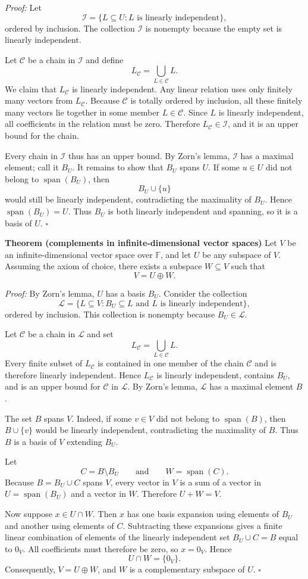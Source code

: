 \documentclass[a4paper,11pt,abstract=true]{scrartcl}
\theoremstyle{dotlessP}
\theoremstyle{dotlessS}
\theoremstyle{remark}
\theoremstyle{definition}
\begin{document}
\textit{Proof:} Let
\[
\mathcal{I}=\{L\subseteq U:L\text{ is linearly independent}\},
\]
ordered by inclusion. The collection $\mathcal{I}$ is nonempty because the
empty set is linearly independent.

Let $\mathcal{C}$ be a chain in $\mathcal{I}$ and define
\[
L_{\mathcal{C}}=\bigcup_{L\in\mathcal{C}}L.
\]
We claim that $L_{\mathcal{C}}$ is linearly independent. Any linear relation
uses only finitely many vectors from $L_{\mathcal{C}}$. Because
$\mathcal{C}$ is totally ordered by inclusion, all these finitely many
vectors lie together in some member $L\in\mathcal{C}$. Since $L$ is linearly
independent, all coefficients in the relation must be zero. Therefore
$L_{\mathcal{C}}\in\mathcal{I}$, and it is an upper bound for the chain.

Every chain in $\mathcal{I}$ thus has an upper bound. By Zorn's lemma,
$\mathcal{I}$ has a maximal element; call it $B_U$. It remains to show that
$B_U$ spans $U$. If some $u\in U$ did not belong to
$\operatorname{span}(B_U)$, then
\[
B_U\cup\{u\}
\]
would still be linearly independent, contradicting the maximality of $B_U$.
Hence $\operatorname{span}(B_U)=U$. Thus $B_U$ is both linearly independent
and spanning, so it is a basis of $U$. \hfill$\square$

\textbf{Theorem (complements in infinite-dimensional vector spaces)} Let
$V$ be an infinite-dimensional vector space over $\mathbb{F}$, and let $U$ be any
subspace of $V$. Assuming the axiom of choice, there exists a subspace
$W\subseteq V$ such that
\[
V=U\oplus W.
\]

\textit{Proof:} By Zorn's lemma, $U$ has a basis $B_U$. Consider the
collection
\[
\mathcal{L}
=\{L\subseteq V:B_U\subseteq L\text{ and }L\text{ is linearly independent}\},
\]
ordered by inclusion. This collection is nonempty because $B_U\in\mathcal{L}$.

Let $\mathcal{C}$ be a chain in $\mathcal{L}$ and set
\[
L_{\mathcal{C}}=\bigcup_{L\in\mathcal{C}}L.
\]
Every finite subset of $L_{\mathcal{C}}$ is contained in one member of the
chain $\mathcal{C}$ and is therefore linearly independent. Hence
$L_{\mathcal{C}}$ is linearly independent, contains $B_U$, and is an upper
bound for $\mathcal{C}$ in $\mathcal{L}$. By Zorn's lemma, $\mathcal{L}$ has
a maximal element $B$.

The set $B$ spans $V$. Indeed, if some $v\in V$ did not belong to
$\operatorname{span}(B)$, then $B\cup\{v\}$ would be linearly independent,
contradicting the maximality of $B$. Thus $B$ is a basis of $V$ extending
$B_U$.

Let
\[
C=B\setminus B_U
\qquad\text{and}\qquad
W=\operatorname{span}(C).
\]
Because $B=B_U\cup C$ spans $V$, every vector in $V$ is a sum of a vector in
$U=\operatorname{span}(B_U)$ and a vector in $W$. Therefore $U+W=V$.

Now suppose $x\in U\cap W$. Then $x$ has one basis expansion using elements
of $B_U$ and another using elements of $C$. Subtracting these expansions
gives a finite linear combination of elements of the linearly independent set
$B_U\cup C=B$ equal to $0_V$. All coefficients must therefore be zero, so
$x=0_V$. Hence
\[
U\cap W=\{0_V\}.
\]
Consequently, $V=U\oplus W$, and $W$ is a complementary subspace of $U$.
\hfill$\square$
\end{document}
